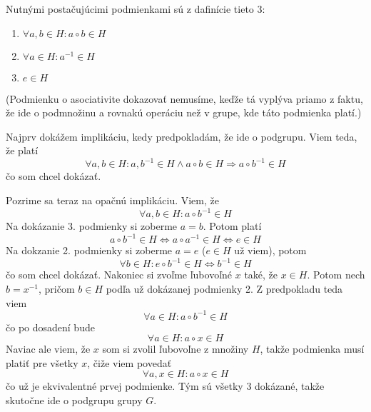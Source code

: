 
Nutnými postačujúcimi podmienkami sú z dafinície tieto 3:
\begin{enumerate}
    \item $\forall a,b\in H: a\circ b\in H$
    \item $\forall a\in H: a^{-1}\in H$
    \item $e\in H$
\end{enumerate}
(Podmienku o asociativite dokazovať nemusíme, keďže tá vyplýva priamo 
z faktu, že ide o podmnožinu a rovnakú operáciu než v grupe, kde táto 
podmienka platí.)

Najprv dokážem implikáciu, kedy predpokladám, že ide o podgrupu. Viem 
teda, že platí
\[\forall a,b\in H: a,b^{-1}\in H\wedge a\circ b\in H
\Rightarrow a\circ b^{-1}\in H\]
čo som chcel dokázať.

Pozrime sa teraz na opačnú implikáciu. Viem, že 
\[\forall a,b\in H: a\circ b^{-1}\in H\]
Na dokázanie 3. podmienky si zoberme $a=b$. Potom platí 
\[ a\circ b^{-1}\in H\Leftrightarrow a\circ a^{-1}\in H
\Leftrightarrow e\in H\]
Na dokzanie 2. podmienky si zoberme $a=e$ ($e\in H$ už viem), potom
\[\forall b\in H: e\circ b^{-1}\in H\Leftrightarrow b^{-1}\in H\]
čo som chcel dokázať.
Nakoniec si zvoľme ľubovoľné $x$ také, že $x\in H$. Potom nech 
$b=x^{-1}$, pričom $b\in H$ podľa už dokázanej podmienky 2. 
Z predpokladu teda viem
\[\forall a\in H: a\circ b^{-1}\in H\]
čo po dosadení bude 
\[\forall a\in H: a\circ x\in H\]
Naviac ale viem, že $x$ som si zvolil ľubovoľne z množiny $H$, takže 
podmienka musí platiť pre všetky $x$, čiže viem povedať 
\[\forall a,x\in H: a\circ x\in H\]
čo už je ekvivalentné prvej podmienke. Tým sú všetky 3 dokázané, takže 
skutočne ide o podgrupu grupy $G$. 

